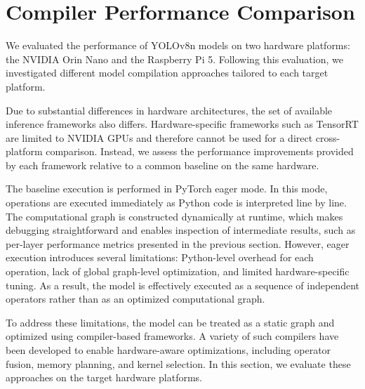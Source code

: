 \documentclass[12pt,a4paper]{report}
\begin{document}
%

\section{Compiler Performance Comparison}


We evaluated the performance of YOLOv8n models on two hardware platforms: the NVIDIA Orin Nano and the
Raspberry Pi 5. Following this evaluation, we investigated different model compilation approaches tailored
to each target platform.

Due to substantial differences in hardware architectures, the set of available inference frameworks also differs.
Hardware-specific frameworks such as TensorRT are limited to NVIDIA GPUs and therefore cannot be used for a direct
cross-platform comparison. Instead, we assess the performance improvements provided by each framework
relative to a common baseline on the same hardware.

The baseline execution is performed in PyTorch eager mode. In this mode, operations are executed immediately as
Python code is interpreted line by line. The computational graph is constructed dynamically at runtime, which
makes debugging straightforward and enables inspection of intermediate results, such as per-layer performance
metrics presented in the previous section. However, eager execution introduces several limitations: Python-level
overhead for each operation, lack of global graph-level optimization, and limited hardware-specific tuning.
As a result, the model is effectively executed as a sequence of independent operators rather than as an optimized
computational graph.

To address these limitations, the model can be treated as a static graph and optimized using compiler-based
frameworks. A variety of such compilers have been developed to enable hardware-aware optimizations, including
operator fusion, memory planning, and kernel selection. In this section, we evaluate these approaches on the
target hardware platforms.
\end{document}
